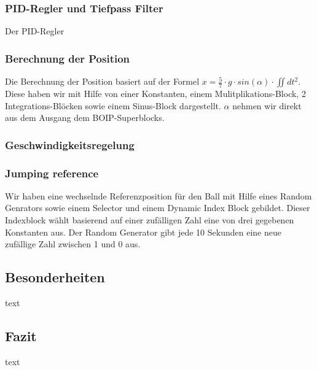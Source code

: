 \subsubsection{PID-Regler und Tiefpass Filter}
Der PID-Regler 

\subsubsection{Berechnung der Position}
Die Berechnung der Position basiert auf der Formel $ x = \frac{5}{7} \cdot g \cdot sin(\alpha) \cdot \iint d t^2 $. Diese haben wir mit Hilfe von einer Konstanten, einem Mulitplikations-Block, 2 Integrations-Blöcken sowie einem Sinus-Block dargestellt. $\alpha $ nehmen wir direkt aus dem Ausgang dem BOIP-Superblocks.

\subsubsection{Geschwindigkeitsregelung}

\subsubsection{Jumping reference}
Wir haben eine wechselnde Referenzposition für den Ball mit Hilfe eines Random Genrators sowie einem Selector und einem Dynamic Index Block gebildet. Dieser Indexblock wählt basierend auf einer zufälligen Zahl eine von drei gegebenen Konstanten aus. Der Random Generator gibt jede 10 Sekunden eine neue zufällige Zahl zwischen 1 und 0 aus.

\subsection{Besonderheiten}
text

\subsection{Fazit}
text
